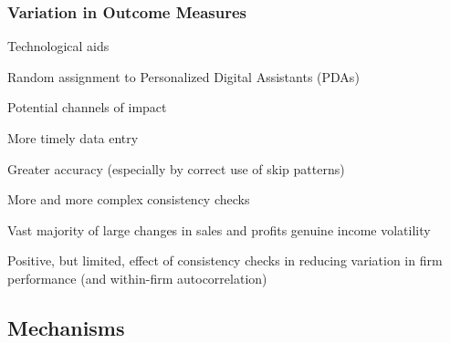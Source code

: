 \documentclass[hideothersubsections, usenames,dvipsnames,11pt]{beamer}
\newenvironment{itemize_2pt}{\itemize\addtolength{\itemsep}{2pt}}{\enditemize}
\newenvironment{enumerate_2pt}{\enumerate\addtolength{\itemsep}{2pt}}{\endenumerate}
\begin{document}

\begin{frame}
\frametitle{Variation in Outcome Measures}
Technological aids \citep{Fafchamps2012}
	\begin{itemize_2pt}
	\item Random assignment to Personalized Digital Assistants (PDAs)
	\item Potential channels of impact
	\begin{enumerate_2pt}
		\item More timely data entry
		\item Greater accuracy (especially by correct use of skip patterns)
		\item More and more complex consistency checks
	
	\end{enumerate_2pt}
	
	\vspace{0.5em}	
	
	\item \textcolor{bdf}{Vast majority of large changes in sales and profits genuine income volatility}
	\item Positive, but limited, effect of consistency checks in reducing variation in firm performance (and within-firm autocorrelation)	
	
	\end{itemize_2pt}
\end{frame}


\subsection{Mechanisms}
\end{document}
